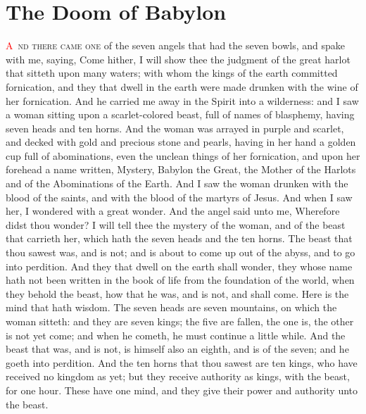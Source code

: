 
\chapter{The Doom of Babylon}
\lettrine[lines=3,slope=-0.5em]{\textcolor{red}{A}}{\ nd there came one} of the seven angels that had the seven bowls, and spake with me, saying, Come hither, I will show thee the judgment of the great harlot that sitteth upon many waters; 
 with whom the kings of the earth committed fornication, and they that dwell in the earth were made drunken with the wine of her fornication. 
 And he carried me away in the Spirit into a wilderness: and I saw a woman sitting upon a scarlet-colored beast, full of names of blasphemy, having seven heads and ten horns. 
 And the woman was arrayed in purple and scarlet, and decked with gold and precious stone and pearls, having in her hand a golden cup full of abominations, even the unclean things of her fornication, 
 and upon her forehead a name written, Mystery, Babylon the Great, the Mother of the Harlots and of the Abominations of the Earth. 
 And I saw the woman drunken with the blood of the saints, and with the blood of the martyrs of Jesus. And when I saw her, I wondered with a great wonder. 
 And the angel said unto me, Wherefore didst thou wonder? I will tell thee the mystery of the woman, and of the beast that carrieth her, which hath the seven heads and the ten horns. 
 The beast that thou sawest was, and is not; and is about to come up out of the abyss, and to go into perdition. And they that dwell on the earth shall wonder, they whose name hath not been written in the book of life from the foundation of the world, when they behold the beast, how that he was, and is not, and shall come. 
 Here is the mind that hath wisdom. The seven heads are seven mountains, on which the woman sitteth: 
 and they are seven kings; the five are fallen, the one is, the other is not yet come; and when he cometh, he must continue a little while. 
 And the beast that was, and is not, is himself also an eighth, and is of the seven; and he goeth into perdition. 
 And the ten horns that thou sawest are ten kings, who have received no kingdom as yet; but they receive authority as kings, with the beast, for one hour. 
 These have one mind, and they give their power and authority unto the beast. 
